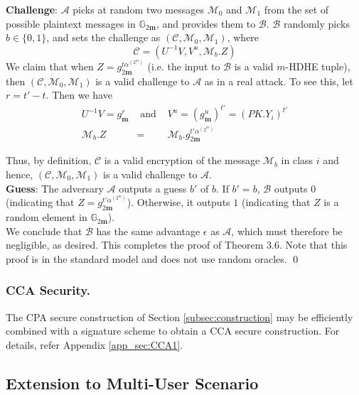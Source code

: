 \noindent \textbf{Challenge}: $\mathcal{A}$ picks at random two messages $\mathcal{M}_0$ and $\mathcal{M}_1$ from the set of possible plaintext messages in $\mathbb{G}_{2\mathbf{m}}$, and provides them to $\mathcal{B}$. $\mathcal{B}$ randomly picks $b\in\{0,1\}$, and sets the challenge as $(\mathcal{C},\mathcal{M}_0,\mathcal{M}_1)$, where 
\begin{equation}
 \mathcal{C}=(U^{-1}V,V^u,\mathcal{M}_b.Z) \nonumber
\end{equation}
\noindent We claim that when $Z=g^{t\alpha^{(2^m)}}_{2\mathbf{m}}$ (i.e. the input to $\mathcal{B}$ is a valid $m$-HDHE tuple), then $(\mathcal{C},\mathcal{M}_0,\mathcal{M}_1)$ is a valid challenge to $\mathcal{A}$ as in a real attack. To see this, let $r=t'-t$. Then we have
\begin{eqnarray}
U^{-1}V=g^r_{\mathbf{m}}  &\text{ and }&  V^u= \left(g^u_{\mathbf{m}}\right)^{t'}=(PK.Y_i)^{t'}\nonumber \\
\mathcal{M}_b.Z&=&\mathcal{M}_b.g^{t'\alpha^{(2^m)}}_{2\mathbf{m}}\nonumber
\end{eqnarray}

\noindent Thus, by definition, $\mathcal{C}$ is a valid encryption of the message $\mathcal{M}_b$ in class $i$ and hence, $(\mathcal{C},\mathcal{M}_0,\mathcal{M}_1)$ is a valid challenge to $\mathcal{A}$. \\
 
\noindent \textbf{Guess}: The adversary $\mathcal{A}$ outputs a guess $b'$ of $b$. If $b' = b$, $\mathcal{B}$ outputs $0$ (indicating that $Z=g^{t'\alpha^{(2^m)}}_{2\mathbf{m}}$). Otherwise, it outputs $1$ (indicating that $Z$ is a random element in $\mathbb{G}_{2\mathbf{m}}$).\\ 

\noindent We conclude that $\mathcal{B}$ has the same advantage $\epsilon$ as $\mathcal{A}$, which must therefore be negligible, as desired. This completes the proof of Theorem 3.6. Note that this proof is in the standard model and does not use random oracles. \hfill\qed 

\subsubsection{CCA Security.} The CPA secure construction of Section \ref{subsec:construction} may be efficiently combined with a signature scheme to obtain a CCA secure construction. For details, refer Appendix \ref{app_sec:CCA1}.


\subsection{Extension to Multi-User Scenario}
\label{subsec:multiuserKAC}

